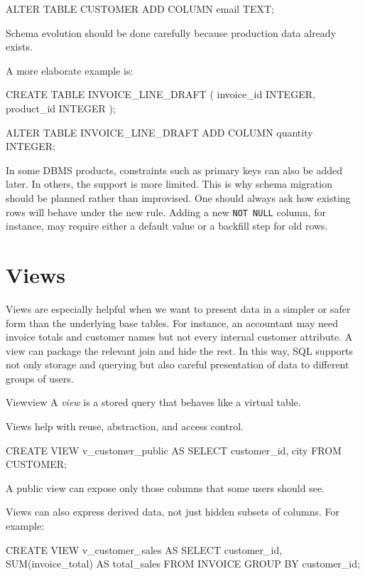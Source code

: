 \documentclass[11pt,a4paper,openany]{book}
\begin{document}
\begin{codesql}
ALTER TABLE CUSTOMER ADD COLUMN email TEXT;
\end{codesql}

Schema evolution should be done carefully because production data already exists.

A more elaborate example is:
\begin{codesql}
CREATE TABLE INVOICE_LINE_DRAFT (
  invoice_id INTEGER,
  product_id INTEGER
);

ALTER TABLE INVOICE_LINE_DRAFT
  ADD COLUMN quantity INTEGER;
\end{codesql}

In some DBMS products, constraints such as primary keys can also be added later. In others, the support is more limited. This is why schema migration should be planned rather than improvised. One should always ask how existing rows will behave under the new rule. Adding a new \texttt{NOT NULL} column, for instance, may require either a default value or a backfill step for old rows.

\section{Views}
Views are especially helpful when we want to present data in a simpler or safer form than the underlying base tables. For instance, an accountant may need invoice totals and customer names but not every internal customer attribute. A view can package the relevant join and hide the rest. In this way, SQL supports not only storage and querying but also careful presentation of data to different groups of users.

\begin{definition}{View}{view}
A \emph{view} is a stored query that behaves like a virtual table.
\end{definition}

Views help with reuse, abstraction, and access control.

\begin{codesql}
CREATE VIEW v_customer_public AS
SELECT customer_id, city
FROM CUSTOMER;
\end{codesql}

A public view can expose only those columns that some users should see.

Views can also express derived data, not just hidden subsets of columns. For example:

\begin{codesql}
CREATE VIEW v_customer_sales AS
SELECT customer_id, SUM(invoice_total) AS total_sales
FROM INVOICE
GROUP BY customer_id;
\end{codesql}
\end{document}
